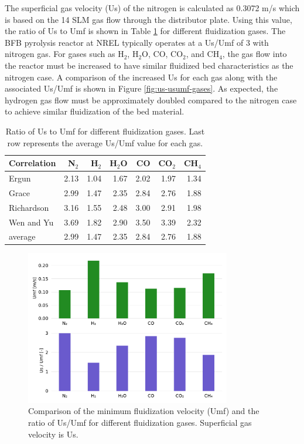 The superficial gas velocity (Us) of the nitrogen is calculated as 0.3072 m/s which is based on the 14 SLM gas flow through the distributor plate. Using this value, the ratio of Us to Umf is shown in Table \ref{tab:us-umf-ratio} for different fluidization gases. The BFB pyrolysis reactor at NREL typically operates at a Us/Umf of 3 with nitrogen gas. For gases such as H$_2$, H$_2$O, CO, CO$_2$, and CH$_4$, the gas flow into the reactor must be increased to have similar fluidized bed characteristics as the nitrogen case. A comparison of the increased Us for each gas along with the associated Us/Umf is shown in Figure \ref{fig:us-usumf-gases}. As expected, the hydrogen gas flow must be approximately doubled compared to the nitrogen case to achieve similar fluidization of the bed material.

\begin{table}[H]
    \centering
    \caption{Ratio of Us to Umf for different fluidization gases. Last row represents the average Us/Umf value for each gas.}
    \label{tab:us-umf-ratio}
    \begin{tabular}{lrrrrrr}
        \toprule
        Correlation & N$_2$ & H$_2$ & H$_2$O & CO & CO$_2$ & CH$_4$ \\
        \midrule
        Ergun      & 2.13 & 1.04 & 1.67 & 2.02 & 1.97 & 1.34 \\
        Grace      & 2.99 & 1.47 & 2.35 & 2.84 & 2.76 & 1.88 \\
        Richardson & 3.16 & 1.55 & 2.48 & 3.00 & 2.91 & 1.98 \\
        Wen and Yu & 3.69 & 1.82 & 2.90 & 3.50 & 3.39 & 2.32 \\
        average    & 2.99 & 1.47 & 2.35 & 2.84 & 2.76 & 1.88 \\
        \bottomrule
    \end{tabular}
\end{table}

\begin{figure}[H]
    \centering
    \includegraphics[width=0.8\textwidth]{figures/umf-usumf-gases.pdf}
    \caption{Comparison of the minimum fluidization velocity (Umf) and the ratio of Us/Umf for different fluidization gases. Superficial gas velocity is Us.}
    \label{fig:umf-usumf-gases}
\end{figure}

